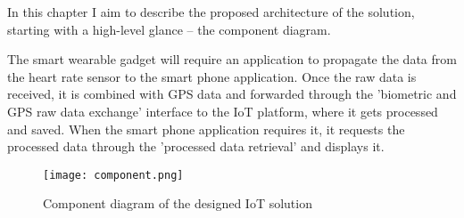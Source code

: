 \linebreak
In this chapter I aim to describe the proposed architecture of the solution, starting with a high-level glance -- the component diagram.

The smart wearable gadget will require an application to propagate the data from the heart rate sensor to the smart phone application.
Once the raw data is received, it is combined with GPS data and forwarded through the 'biometric and GPS raw data exchange' interface to the IoT platform, where it gets processed and saved.
When the smart phone application requires it, it requests the processed data through the 'processed data retrieval' and displays it.

\begin{figure}[h]
    \texttt{[image: component.png]}
    \caption{Component diagram of the designed IoT solution}
\end{figure}